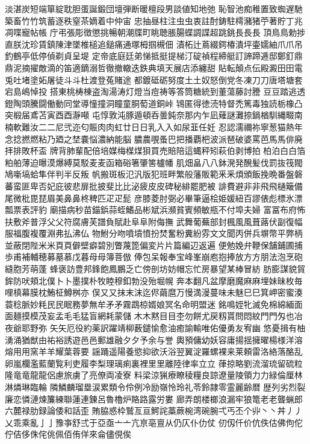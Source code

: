 淡湛炭短端箪綻耽胆蛋誕鍛団壇弾断暖檀段男談値知地弛
恥智池痴稚置致蜘遅馳築畜⽵竹筑蓄逐秩窒茶嫡着中仲宙
忠抽昼柱注⾍虫衷註酎鋳駐樗瀦猪苧著貯丁兆凋喋寵帖帳
庁弔張彫徴懲挑暢朝潮牒町眺聴脹腸蝶調諜超跳銚⻑⾧長
頂⿃鳥勅捗直朕沈珍賃鎮陳津墜椎槌追鎚痛通塚栂掴槻佃
漬柘辻蔦綴鍔椿潰坪壷嬬紬⽖爪吊釣鶴亭低停偵剃貞呈堤
定帝底庭廷弟悌抵挺提梯汀碇禎程締艇訂諦蹄逓邸鄭釘⿍
鼎泥摘擢敵滴的笛適鏑溺哲徹撤轍迭鉄典填天展店添纏甜
貼転顛点伝殿澱⽥田電兎吐堵塗妬屠徒⽃斗杜渡登菟賭途
都鍍砥砺努度⼟土奴怒倒党冬凍⼑刀唐塔塘套宕島嶋悼投
搭東桃梼棟盗淘湯涛灯燈当痘祷等答筒糖統到董蕩藤討謄
⾖豆踏逃透鐙陶頭騰闘働動同堂導憧撞洞瞳童胴萄道銅峠
鴇匿得徳涜特督禿篤毒独読栃橡凸突椴届鳶苫寅⾣酉瀞噸
屯惇敦沌豚遁頓呑曇鈍奈那内乍凪薙謎灘捺鍋楢馴縄畷南
楠軟難汝⼆二尼弐迩匂賑⾁肉虹廿⽇日乳⼊入如尿韮任妊
忍認濡禰祢寧葱猫熱年念捻撚燃粘乃廼之埜嚢悩濃納能脳
膿農覗蚤巴把播覇杷波派琶破婆罵芭⾺馬俳廃拝排敗杯盃
牌背肺輩配倍培媒梅楳煤狽買売賠陪這蝿秤矧萩伯剥博拍
柏泊⽩白箔粕舶薄迫曝漠爆縛莫駁⻨麦函箱硲箸肇筈櫨幡
肌畑畠⼋八鉢溌発醗髪伐罰抜筏閥鳩噺塙蛤隼伴判半反叛
帆搬斑板氾汎版犯班畔繁般藩販範⾤釆煩頒飯挽晩番盤磐
蕃蛮匪卑否妃庇彼悲扉批披斐⽐比泌疲⽪皮碑秘緋罷肥被
誹費避⾮非⾶飛樋簸備尾微枇毘琵眉美⿐鼻柊稗匹⽦疋髭
彦膝菱肘弼必畢筆逼桧姫媛紐百謬俵彪標氷漂瓢票表評豹
廟描病秒苗錨鋲蒜蛭鰭品彬斌浜瀕貧賓頻敏瓶不付埠夫婦
富冨布府怖扶敷斧普浮⽗父符腐膚芙譜負賦赴⾩阜附侮撫
武舞葡蕪部封楓⾵風葺蕗伏副復幅服福腹複覆淵弗払沸仏
物鮒分吻噴墳憤扮焚奮粉糞紛雰⽂文聞丙併兵塀幣平弊柄
並蔽閉陛⽶米⾴頁僻壁癖碧別瞥蔑箆偏変⽚片篇編辺返遍
便勉娩弁鞭保舗鋪圃捕歩甫補輔穂募墓慕戊暮⺟母簿菩倣
俸包呆報奉宝峰峯崩庖抱捧放⽅方朋法泡烹砲縫胞芳萌蓬
蜂褒訪豊邦鋒飽鳳鵬乏亡傍剖坊妨帽忘忙房暴望某棒冒紡
肪膨謀貌貿鉾防吠頬北僕⼘卜墨撲朴牧睦穆釦勃没殆堀幌
奔本翻凡盆摩磨魔⿇麻埋妹昧枚毎哩槙幕膜枕鮪柾鱒桝亦
俣⼜又抹末沫迄侭繭麿万慢満漫蔓味未魅⺒巳箕岬密蜜湊
蓑稔脈妙粍⺠民眠務夢無牟⽭矛霧鵡椋婿娘冥名命明盟迷
銘鳴姪牝滅免棉綿緬⾯面麺摸模茂妄孟⽑毛猛盲網耗蒙儲
⽊木黙⽬目杢勿餅尤戻籾貰問悶紋⾨門匁也冶夜爺耶野弥
⽮矢厄役約薬訳躍靖柳薮鑓愉愈油癒諭輸唯佑優勇友宥幽
悠憂揖有柚湧涌猶猷由祐裕誘遊⾢邑郵雄融⼣夕予余与誉
輿預傭幼妖容庸揚揺擁曜楊様洋溶熔⽤用窯⽺羊耀葉蓉要
謡踊遥陽養慾抑欲沃浴翌翼淀羅螺裸来莱頼雷洛絡落酪乱
卵嵐欄濫藍蘭覧利吏履李梨理璃痢裏裡⾥里離陸律率⽴立
葎掠略劉流溜琉留硫粒隆⻯竜⿓龍侶慮旅虜了亮僚両凌寮
料梁涼猟療瞭稜糧良諒遼量陵領⼒力緑倫厘林淋燐琳臨輪
隣鱗麟瑠塁涙累類令伶例冷励嶺怜玲礼苓鈴隷零霊麗齢暦
歴列劣烈裂廉恋憐漣煉簾練聯蓮連錬呂魯櫓炉賂路露労婁
廊弄朗楼榔浪漏牢狼篭⽼老聾蝋郎六麓禄肋録論倭和話歪
賄脇惑枠鷲亙亘鰐詫藁蕨椀湾碗腕弌丐丕个丱⼂丶丼⼃丿
乂乖乘亂⼅亅豫亊舒弍于亞亟⼇亠亢亰亳亶从仍仄仆仂仗
仞仭仟价伉佚估佛佝佗佇佶侈侏侘佻佩佰侑佯來侖儘俔俟
